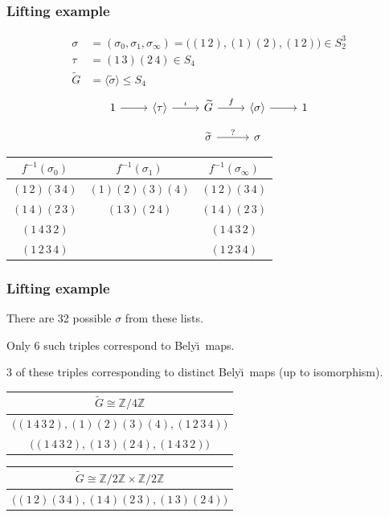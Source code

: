 \documentclass[xcolor=dvipsnames]{beamer}
\theoremstyle{plain}
\newcommand{\Z}{\mathbb Z}
\newcommand{\Belyi}{Bely\u{\i}}
\begin{document}
  \begin{frame}[plain]
    \frametitle{Lifting example \Coffeecup}
    \pause
    \begin{align*}
      \sigma &= (\sigma_0,\sigma_1,\sigma_\infty)
      =\Big((1\,2),(1)(2),(1\,2)\Big)\in S_2^3\\
      \tau &= (1\,3)(2\,4)\in S_4\\
      \widetilde{G} &= \langle\widetilde{\sigma}\rangle\leq S_4
    \end{align*}
    \pause
    \[
      \begin{tikzcd}[ampersand replacement=\&, row sep = small]
        1\arrow{r}\&\langle\tau\rangle\arrow{r}{\iota}\&\widetilde{G}\arrow{r}{f}\&\langle\sigma\rangle\arrow{r}\&1\\
        \&\&\widetilde{\sigma}\arrow{r}{?}\&\sigma
      \end{tikzcd}
    \]
    \pause
    \begin{center}
      \begin{tabular}{ccc}
        \toprule
        $f^{-1}(\sigma_0)$
        & $f^{-1}(\sigma_1)$
        & $f^{-1}(\sigma_\infty)$\\
        \midrule
        $(1\,2)(3\,4)$ & $(1)(2)(3)(4)$ & $(1\,2)(3\,4)$\\
        $(1\,4)(2\,3)$ & $(1\,3)(2\,4)$ & $(1\,4)(2\,3)$\\
        $(1\,4\,3\,2)$ && $(1\,4\,3\,2)$\\
        $(1\,2\,3\,4)$ && $(1\,2\,3\,4)$\\
        \bottomrule
      \end{tabular}
    \end{center}
  \end{frame}
  \begin{frame}[plain]
    \frametitle{Lifting example \Coffeecup}
    \pause
    \par
    There are 32 possible $\sigma$ from these lists.
    \pause
    \par
    Only 6 such triples correspond to \Belyi\ maps.
    \pause
    \par
    3 of these triples
    corresponding to distinct \Belyi\ maps (up to isomorphism).
    \pause
    \begin{center}
      \begin{tabular}{c}
        \toprule
        $\widetilde{G}\cong\Z/4\Z$\\
        \midrule
        $\Big((1\,4\,3\,2),(1)(2)(3)(4),(1\,2\,3\,4)\Big)$\\
        $\Big((1\,4\,3\,2),(1\,3)(2\,4),(1\,4\,3\,2)\Big)$\\
        \bottomrule
      \end{tabular}
    \end{center}
    \begin{center}
      \begin{tabular}{c}
        \toprule
        $\widetilde{G}\cong\Z/2\Z\times\Z/2\Z$\\
        \midrule
        $\Big((1\,2)(3\,4),(1\,4)(2\,3),(1\,3)(2\,4)\Big)$\\
        \bottomrule
      \end{tabular}
    \end{center}
  \end{frame}
\end{document}
